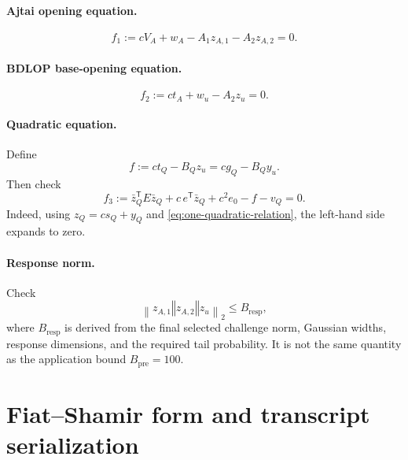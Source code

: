 \documentclass[11pt,a4paper]{article}
\newcommand{\norm}[1]{\left\lVert #1\right\rVert}
\newcommand{\concat}{\mathbin\Vert}
\newcommand{\transpose}{\mathsf{T}}
\begin{document}
\paragraph{Ajtai opening equation.}
\begin{equation}
  f_1:=cV_A+w_A-A_1z_{A,1}-A_2z_{A,2}=0.
  \label{eq:f1}
\end{equation}

\paragraph{BDLOP base-opening equation.}
\begin{equation}
  f_2:=ct_A+w_u-A_2z_u=0.
  \label{eq:f2}
\end{equation}

\paragraph{Quadratic equation.}
Define
\begin{equation}
  f:=ct_Q-B_Qz_u=cg_Q-B_Qy_u.
  \label{eq:f-correction}
\end{equation}
Then check
\begin{equation}
  f_3:=
  \bar z_Q^{\transpose}E\bar z_Q
  +c\,e^{\transpose}\bar z_Q
  +c^2e_0-f-v_Q=0.
  \label{eq:f3}
\end{equation}
Indeed, using \(z_Q=cs_Q+y_Q\) and
\cref{eq:one-quadratic-relation}, the left-hand side expands to zero.

\paragraph{Response norm.}
Check
\begin{equation}
  \norm{z_{A,1}\concat z_{A,2}\concat z_u}_2
  \le B_{\mathrm{resp}},
  \label{eq:response-bound}
\end{equation}
where \(B_{\mathrm{resp}}\) is derived from the final selected challenge norm,
Gaussian widths, response dimensions, and the required tail probability.  It is
not the same quantity as the application bound \(B_{\mathrm{pre}}=100\).

\section{Fiat--Shamir form and transcript serialization}
\end{document}
